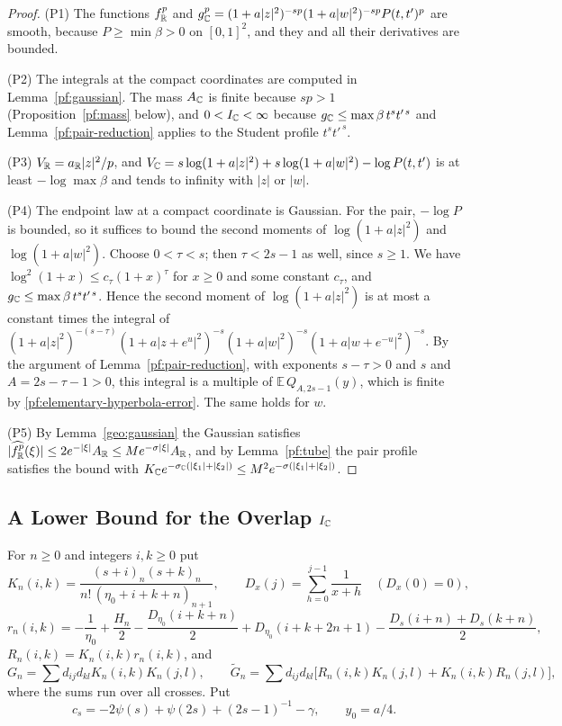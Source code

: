 \begin{proof}
(P1) The functions $f_\mathbb R^p$ and
$g_\mathbb C^p=(1+a|z|^2)^{-sp}(1+a|w|^2)^{-sp}P(t,t')^p$ are smooth, because
$P\ge\min\beta>0$ on $[0,1]^2$, and they and all their derivatives are
bounded.

(P2) The integrals at the compact coordinates are computed in
Lemma~\ref{pf:gaussian}. The mass $A_\mathbb C$ is finite because $sp>1$
(Proposition~\ref{pf:mass} below), and $0<I_\mathbb C<\infty$ because
$g_\mathbb C\le\max\beta\,t^st'^{\,s}$ and Lemma~\ref{pf:pair-reduction}
applies to the Student profile $t^st'^{\,s}$.

(P3) $V_\mathbb R=a_\mathbb R|z|^2/p$, and
$V_\mathbb C=s\log(1+a|z|^2)+s\log(1+a|w|^2)-\log P(t,t')$ is at least
$-\log\max\beta$ and tends to infinity with $|z|$ or $|w|$.

(P4) The endpoint law at a compact coordinate is Gaussian. For the pair,
$-\log P$ is bounded, so it suffices to bound the second moments of
$\log(1+a|z|^2)$ and $\log(1+a|w|^2)$. Choose $0<\tau<s$; then
$\tau<2s-1$ as well, since $s\ge1$. We have
$\log^2(1+x)\le c_\tau(1+x)^\tau$ for $x\ge0$ and some constant
$c_\tau$, and $g_\mathbb C\le\max\beta\,t^st'^{\,s}$. Hence the second moment
of $\log(1+a|z|^2)$ is at most a constant times the integral of
$(1+a|z|^2)^{-(s-\tau)}(1+a|z+e^u|^2)^{-s}(1+a|w|^2)^{-s}
(1+a|w+e^{-u}|^2)^{-s}$. By the argument of
Lemma~\ref{pf:pair-reduction}, with exponents $s-\tau>0$ and $s$ and
$A=2s-\tau-1>0$, this integral is a multiple of
$\mathbb E\,Q_{A,2s-1}(y)$, which is finite by
\eqref{pf:elementary-hyperbola-error}. The same holds for $w$.

(P5) By Lemma~\ref{geo:gaussian} the Gaussian satisfies
$|\widehat{f_\mathbb R^p}(\xi)|\le2e^{-|\xi|}A_\mathbb R\le Me^{-\sigma|\xi|}A_\mathbb R$, and by
Lemma~\ref{pf:tube} the pair profile satisfies the bound with
$K_\mathbb C e^{-\sigma_\mathbb C(|\xi_1|+|\xi_2|)}\le
M^2e^{-\sigma(|\xi_1|+|\xi_2|)}$.
\end{proof}

\subsection{\texorpdfstring{A Lower Bound for the Overlap $I_\mathbb C$}{A Lower Bound for the Overlap}}

\begin{definition}\label{pf:overlap-coefficients}
For $n\ge0$ and integers $i,k\ge0$ put
\[
 K_n(i,k)=\frac{(s+i)_n(s+k)_n}{n!\,(\eta_0+i+k+n)_{n+1}},\qquad
 D_x(j)=\sum_{h=0}^{j-1}\frac1{x+h}\quad(D_x(0)=0),
\]
\[
 r_n(i,k)=-\frac1{\eta_0}+\frac{H_n}2-\frac{D_{\eta_0}(i+k+n)}2
 +D_{\eta_0}(i+k+2n+1)-\frac{D_s(i+n)+D_s(k+n)}2,
\]
$R_n(i,k)=K_n(i,k)r_n(i,k)$, and
\[
 G_n=\sum d_{ij}d_{kl}K_n(i,k)K_n(j,l),\qquad
 \widetilde G_n=\sum d_{ij}d_{kl}\bigl[R_n(i,k)K_n(j,l)+K_n(i,k)R_n(j,l)\bigr],
\]
where the sums run over all crosses. Put
\begin{equation}\label{pf:student-constant}
 c_s=-2\psi(s)+\psi(2s)+(2s-1)^{-1}-\gamma ,\qquad y_0=a/4 .
\end{equation}
\end{definition}

